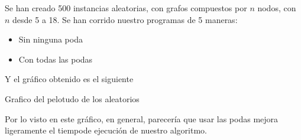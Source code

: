 Se han creado 500 instancias aleatorias, con grafos compuestos por $n$ nodos, con $n$ desde 5 a 18. Se han corrido nuestro programas de 5 maneras:

\begin{itemize}
	\item Sin ninguna poda
	\item Con todas las podas 
\end{itemize}

Y el gráfico obtenido es el siguiente

Grafico del pelotudo de los aleatorios

Por lo visto en este gráfico, en general, parecería que usar las podas mejora ligeramente el tiempode ejecución de nuestro algoritmo.